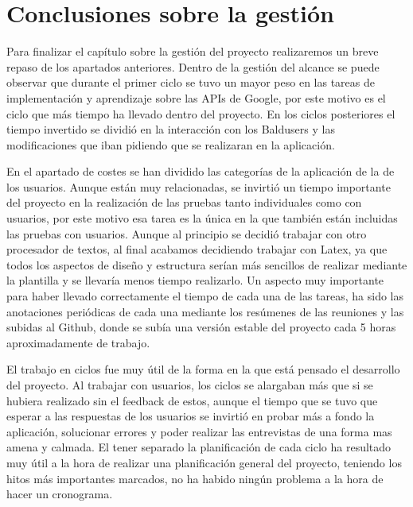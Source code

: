 \section{Conclusiones sobre la gestión}
\label{secc:Conclusiones sobre la gestión}

Para finalizar el capítulo sobre la gestión del proyecto realizaremos un breve repaso de los apartados anteriores. Dentro de la gestión del alcance se puede observar que durante el primer ciclo se tuvo un mayor peso en las tareas de implementación y aprendizaje sobre las APIs de Google, por este motivo es el ciclo que más tiempo ha llevado dentro del proyecto. En los ciclos posteriores el tiempo invertido se dividió en la interacción con los Baldusers y las modificaciones que iban pidiendo que se realizaran en la aplicación.

En el apartado de costes se han dividido las categorías de la aplicación de la de los usuarios. Aunque están muy relacionadas, se invirtió un tiempo importante del proyecto en la realización de las pruebas tanto individuales como con usuarios, por este motivo esa tarea es la única en la que también están incluidas las pruebas con usuarios.
Aunque al principio se decidió trabajar con otro procesador de textos, al final acabamos decidiendo trabajar con Latex, ya que todos los aspectos de diseño y estructura serían más sencillos de realizar mediante la plantilla y se llevaría menos tiempo realizarlo.
Un aspecto muy importante para haber llevado correctamente el tiempo de cada una de las tareas, ha sido las anotaciones periódicas de cada una mediante los resúmenes de las reuniones y las subidas al Github, donde se subía una versión estable del proyecto cada 5 horas aproximadamente de trabajo.

El trabajo en ciclos fue muy útil de la forma en la que está pensado el desarrollo del proyecto. Al trabajar con usuarios, los ciclos se alargaban más que si se hubiera realizado sin el feedback de estos, aunque el tiempo que se tuvo que esperar a las respuestas de los usuarios se invirtió en probar más a fondo la aplicación, solucionar errores y poder realizar las entrevistas de una forma mas amena y calmada.
El tener separado la planificación de cada ciclo ha resultado muy útil a la hora de realizar una planificación general del proyecto, teniendo los hitos más importantes marcados, no ha habido ningún problema a la hora de hacer un cronograma.




